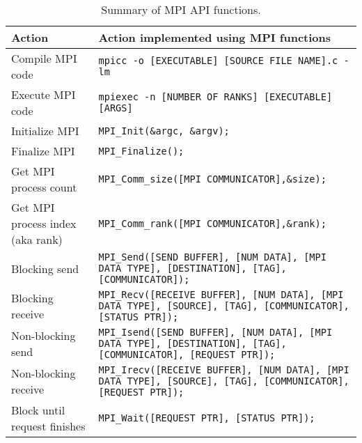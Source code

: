 \begin{table}[H]
\caption{Summary of MPI API functions.}
\centering
\begin{tabular}{>{\raggedright\arraybackslash}m{6cm}|m{10cm}}
\hline
\textbf{Action} & \textbf{Action implemented using MPI functions} \\
\hline
Compile MPI code & \texttt{mpicc -o [EXECUTABLE] [SOURCE FILE NAME].c -lm} \\
\hline
Execute MPI code & \texttt{mpiexec -n [NUMBER OF RANKS] [EXECUTABLE] [ARGS]} \\
\hline
Initialize MPI & \texttt{MPI\_Init(\&argc, \&argv);} \\
\hline
Finalize MPI & \texttt{MPI\_Finalize();} \\
\hline
Get MPI process count & \texttt{MPI\_Comm\_size([MPI COMMUNICATOR],\&size);} \\
\hline
Get MPI process index (aka rank) & \texttt{MPI\_Comm\_rank([MPI COMMUNICATOR],\&rank);} \\
\hline
Blocking send & \texttt{MPI\_Send([SEND BUFFER], [NUM DATA], [MPI DATA TYPE], [DESTINATION], [TAG], [COMMUNICATOR]);} \\
\hline
Blocking receive & \texttt{MPI\_Recv([RECEIVE BUFFER], [NUM DATA], [MPI DATA TYPE], [SOURCE], [TAG], [COMMUNICATOR], [STATUS PTR]);} \\
\hline
Non-blocking send & \texttt{MPI\_Isend([SEND BUFFER], [NUM DATA], [MPI DATA TYPE], [DESTINATION], [TAG], [COMMUNICATOR], [REQUEST PTR]);} \\
\hline
Non-blocking receive & \texttt{MPI\_Irecv([RECEIVE BUFFER], [NUM DATA], [MPI DATA TYPE], [SOURCE], [TAG], [COMMUNICATOR], [REQUEST PTR]);} \\
\hline
Block until request finishes & \texttt{MPI\_Wait([REQUEST PTR], [STATUS PTR]);} \\
\hline
\end{tabular}
\label{table:mpi_directives}
\end{table}

